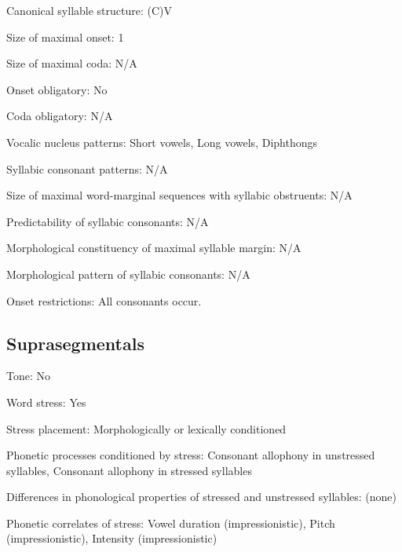 {\begin{appendixdesc}
\item[Canonical syllable structure:] (C)V \citep[533--538]{Bauer1999}

\item[Size of maximal onset:] 1

\item[Size of maximal coda:] N/A

\item[Onset obligatory:] No

\item[Coda obligatory:] N/A

\item[Vocalic nucleus patterns:] Short vowels, Long vowels, Diphthongs

\item[Syllabic consonant patterns:] N/A

\item[Size of maximal word-marginal sequences with syllabic obstruents:] N/A

\item[Predictability of syllabic consonants:] N/A

\item[Morphological constituency of maximal syllable margin:] N/A

\item[Morphological pattern of syllabic consonants:] N/A

\item[Onset restrictions:] All consonants occur.
\end{appendixdesc}
\subsection*{Suprasegmentals}
\begin{appendixdesc}
\item[Tone:] No

\item[Word stress:] Yes

\item[Stress placement:] Morphologically or lexically conditioned

\item[Phonetic processes conditioned by stress:] Consonant allophony in unstressed syllables, Consonant allophony in stressed syllables

\item[Differences in phonological properties of stressed and unstressed syllables:] (none)

\item[Phonetic correlates of stress:] Vowel duration (impressionistic), Pitch (impressionistic), Intensity (impressionistic)


\end{appendixdesc}}
